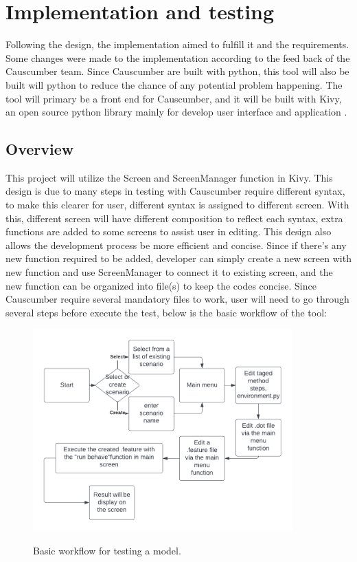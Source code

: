 \chapter{Implementation and testing}
Following the design, the implementation aimed to fulfill it and the requirements. Some changes were made to the implementation according to the feed back of the Causcumber team. Since Causcumber are built with python, this tool will also be built will python to reduce the chance of any potential problem happening. The tool will primary be a front end for Causcumber, and it will be built with Kivy, an open source python library mainly for develop user interface and application \cite{Reference20}. 

\section{Overview}
This project will utilize the Screen and ScreenManager function in Kivy. This design is due to many steps in testing with Causcumber require different syntax, to make this clearer for user, different syntax is assigned to different screen. With this, different screen will have different composition to reflect each syntax, extra functions are added to some screens to assist user in editing. This design also allows the development process be more efficient and concise. Since if there’s any new function required to be added, developer can simply create a new screen with new function and use ScreenManager to connect it to existing screen, and the new function can be organized into file(s) to keep the codes concise. Since Causcumber require several mandatory files to work, user will need to go through several steps before execute the test, below is the basic workflow of the tool:
\begin{figure}[H]
	\centering
	\includegraphics[width=10cm]{figures/workFlow.png}\\
	\caption{Basic workflow for testing a model.}
	\label{fig:figure9}
\end{figure}


